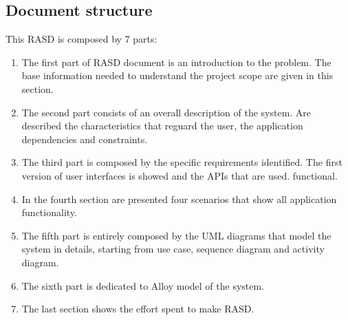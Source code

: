 \subsection{Document structure}
This RASD is composed by 7 parts:
\begin{enumerate}
	\item The first part of RASD document is an introduction to the problem. The base information needed to understand the project scope are given in this section.
	\item The second part consists of an overall description of the system. Are described the characteristics that reguard the user, the application dependencies and constraints.
	\item The third part is composed by the specific requirements identified. The first version of user interfaces is showed and the APIs that are used. 
	functional.
	\item In the fourth section are presented four scenarios that show all application functionality.
	\item The fifth part is entirely composed by the UML diagrams that model the system in details, starting from use case, sequence diagram and activity diagram.
	\item The sixth part is dedicated to Alloy model of the system.
	\item The last section shows the effort spent to make RASD.
\end{enumerate}
